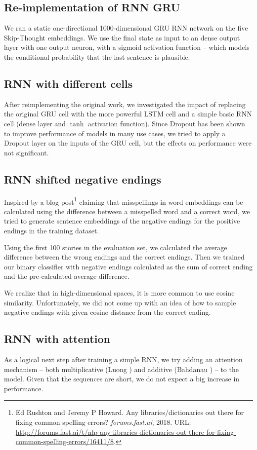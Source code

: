 \documentclass{article}
\begin{document}
\subsection{Re-implementation of RNN GRU}
We ran a static one-directional 1000-dimensional GRU RNN network on the five Skip-Thought embeddings. We use the final state as input to an dense output layer with one output neuron, with a sigmoid activation function -- which models the conditional probability that the last sentence is plausible.

\subsection{RNN with different cells}
After reimplementing the original work, we investigated the impact of replacing the original GRU cell with the more powerful LSTM cell and a simple basic RNN cell (dense layer and $\tanh$ activation function). Since Dropout \citep{Srivastava2014} has been shown to improve performance of models in many use cases, we tried to apply a Dropout layer on the inputs of the GRU cell, but the effects on performance were not significant.

\subsection{RNN shifted negative endings}
Inspired by a blog post\footnote{Ed Rushton and Jeremy P Howard. Any libraries/dictionaries out there for fixing common spelling errors? \textit{forums.fast.ai}, 2018. URL: \url{http://forums.fast.ai/t/nlp-any-libraries-dictionaries-out-there-for-fixing-common-spelling-errors/16411/8}.} claiming that misspellings in word embeddings can be calculated using the difference between a misspelled word and a correct word, we tried to generate sentence embeddings of the negative endings for the positive endings in the training dataset. 

Using the first 100 stories in the evaluation set, we calculated the average difference between the wrong endings and the correct endings. Then we trained our binary classifier with negative endings calculated as the sum of correct ending and the pre-calculated average difference.

We realize that in high-dimensional spaces, it is more common to use cosine similarity. Unfortunately, we did not come up with an idea of how to sample negative endings with given cosine distance from the correct ending.

\subsection{RNN with attention}
As a logical next step after training a simple RNN, we try adding an attention mechanism -- both multiplicative (Luong \citep{Luong2015EffectiveTranslation}) and additive (Bahdanau \citep{Bahdanau2016End-to-EndRecognition}) -- to the model. Given that the sequences are short, we do not expect a big increase in performance.
\end{document}

